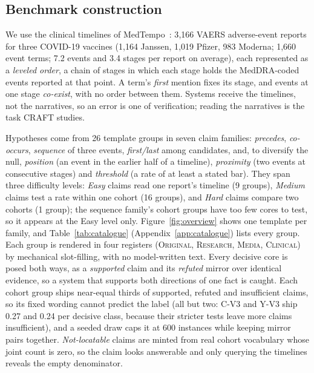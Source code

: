\subsection{Benchmark construction}
\label{sec:construction}
\label{sec:corpus}

We use the clinical timelines of MedTempo~\cite{craft2026}: 3{,}166 VAERS
adverse-event reports for three COVID-19 vaccines (1{,}164 Janssen, 1{,}019
Pfizer, 983 Moderna; 1{,}660 event terms; 7.2 events and 3.4 stages per
report on average), each represented as a \emph{leveled order}, a chain of
stages in which each stage holds the MedDRA-coded events reported at that
point. A term's \emph{first} mention fixes its stage, and events at one stage
\emph{co-exist}, with no order between them. Systems receive the timelines, not
the narratives, so an error is one of verification; reading the narratives
is the task CRAFT studies.

\label{sec:space}\label{sec:realization}
Hypotheses come from 26 template groups in seven claim families:
\emph{precedes}, \emph{co-occurs}, \emph{sequence} of three events,
\emph{first/last} among candidates, and, to diversify the null,
\emph{position} (an event in the earlier half of a timeline),
\emph{proximity} (two events at consecutive stages) and \emph{threshold} (a
rate of at least a stated bar). They span three difficulty levels:
\emph{Easy} claims read one report's timeline (9 groups), \emph{Medium}
claims test a rate within one cohort (16 groups), and \emph{Hard} claims
compare two cohorts (1 group); the sequence family's cohort groups have
too few cores to test, so it appears at the Easy level only. Figure~\ref{fig:overview} shows one template
per family, and Table~\ref{tab:catalogue} (Appendix~\ref{app:catalogue})
lists every group. Each group is rendered in four registers
(\textsc{Original}, \textsc{Research}, \textsc{Media}, \textsc{Clinical}) by
mechanical slot-filling, with no model-written text. Every decisive core is
posed both ways, as a \emph{supported} claim and its \emph{refuted} mirror
over identical evidence, so a system that supports both directions of one
fact is caught. Each cohort group ships near-equal thirds of
supported, refuted and insufficient claims, so its fixed wording cannot
predict the label (all but two: C-V3 and Y-V3 ship 0.27 and 0.24 per
decisive class, because their stricter tests leave more claims
insufficient), and a seeded draw caps it at 600 instances while keeping
mirror pairs together. \emph{Not-locatable} claims are
minted from real cohort vocabulary whose joint count is zero, so the claim
looks answerable and only querying the timelines reveals the empty
denominator.

